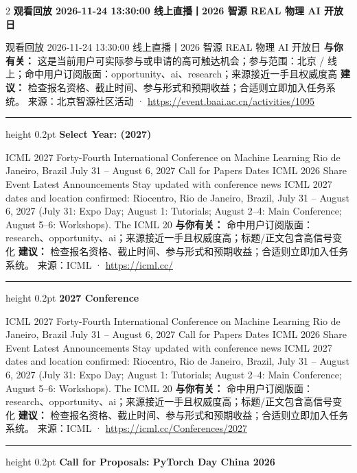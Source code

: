 \documentclass[10.5pt]{ctexart}
\begin{document}
\begin{multicols}{2}
{\large\bfseries 观看回放 2026-11-24 13:30:00 线上直播丨2026 智源 REAL 物理 AI 开放日}\par
观看回放 2026-11-24 13:30:00 线上直播丨2026 智源 REAL 物理 AI 开放日
\textbf{与你有关：} 这是当前用户可实际参与或申请的高可触达机会；参与范围：北京 / 线上；命中用户订阅版面：opportunity、ai、research；来源接近一手且权威度高
\textbf{建议：} 检查报名资格、截止时间、参与形式和预期收益；合适则立即加入任务系统。
{\footnotesize\color{ormuted} 来源：北京智源社区活动 · \url{https://event.baai.ac.cn/activities/1095}}
\vspace{2mm}
\hrule height 0.2pt
\vspace{2mm}
{\large\bfseries Select Year: (2027)}\par
ICML 2027 Forty-Fourth International Conference on Machine Learning Rio de Janeiro, Brazil July 31 – August 6, 2027 Call for Papers Dates ICML 2026 Share Event Latest Announcements Stay updated with conference news ICML 2027 dates and location confirmed: Riocentro, Rio de Janeiro, Brazil, July 31 – August 6, 2027 (July 31: Expo Day; August 1: Tutorials; August 2–4: Main Conference; August 5–6: Workshops). The ICML 20
\textbf{与你有关：} 命中用户订阅版面：research、opportunity、ai；来源接近一手且权威度高；标题/正文包含高信号变化
\textbf{建议：} 检查报名资格、截止时间、参与形式和预期收益；合适则立即加入任务系统。
{\footnotesize\color{ormuted} 来源：ICML · \url{https://icml.cc/}}
\vspace{2mm}
\hrule height 0.2pt
\vspace{2mm}
{\large\bfseries 2027 Conference}\par
ICML 2027 Forty-Fourth International Conference on Machine Learning Rio de Janeiro, Brazil July 31 – August 6, 2027 Call for Papers Dates ICML 2026 Share Event Latest Announcements Stay updated with conference news ICML 2027 dates and location confirmed: Riocentro, Rio de Janeiro, Brazil, July 31 – August 6, 2027 (July 31: Expo Day; August 1: Tutorials; August 2–4: Main Conference; August 5–6: Workshops). The ICML 20
\textbf{与你有关：} 命中用户订阅版面：research、opportunity、ai；来源接近一手且权威度高；标题/正文包含高信号变化
\textbf{建议：} 检查报名资格、截止时间、参与形式和预期收益；合适则立即加入任务系统。
{\footnotesize\color{ormuted} 来源：ICML · \url{https://icml.cc/Conferences/2027}}
\vspace{2mm}
\hrule height 0.2pt
\vspace{2mm}
{\large\bfseries Call for Proposals: PyTorch Day China 2026}\par

\end{multicols}
\end{document}
